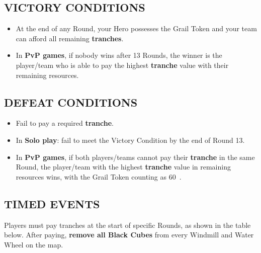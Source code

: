 \begin{multicols*}{2}
\subsection*{\MakeUppercase{Victory Conditions}}

\begin{itemize}
  \item At the end of any Round, your Hero possesses the Grail Token and your team can afford all remaining \textbf{tranches}.
  \item In \textbf{PvP games}, if nobody wins after 13 Rounds, the winner is the player/team who is able to pay the highest \textbf{tranche} value with their remaining resources.
\end{itemize}

\columnbreak

\subsection*{\MakeUppercase{Defeat Conditions}}

\begin{itemize}
  \item Fail to pay a required \textbf{tranche}.
  \item In \textbf{Solo play}: fail to meet the Victory Condition by the end of Round 13.
  \item In \textbf{PvP games}, if both players/teams cannot pay their \textbf{tranche} in the same Round, the player/team with the highest \textbf{tranche} value in remaining resources wins, with the Grail Token counting as 60~.
\end{itemize}

\subsection*{\MakeUppercase{Timed Events}}

Players must pay tranches at the start of specific Rounds, as shown in the table below. After paying, \textbf{remove all Black Cubes} from every Windmill and Water Wheel on the map.



\end{multicols*}
